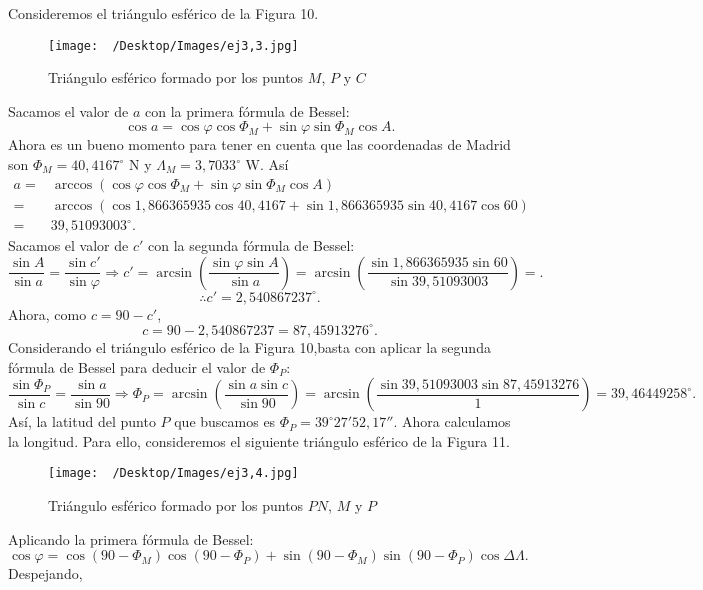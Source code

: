 \documentclass{article}
\begin{document}
\begin{sol}
Consideremos el triángulo esférico de la Figura 10. 
\begin{figure}
\centering
\texttt{[image: ~/Desktop/Images/ej3,3.jpg]}
\caption{Triángulo esférico formado por los puntos $\displaystyle M $, $\displaystyle P $ y $\displaystyle C $}
\label{}
\end{figure}Sacamos el valor de $\displaystyle a $ con la primera fórmula de Bessel:
\[ \cos a = \cos \varphi \cos \Phi_{M} + \sin\varphi \sin\Phi_{M}\cos A.\]
Ahora es un bueno momento para tener en cuenta que las coordenadas de Madrid son $\displaystyle \Phi_{M} = 40,4167^{\circ} $ N y $\displaystyle \Lambda_{M} = 3,7033^{\circ} $ W. Así
\[
\begin{split}
	a = & \arccos\left(\cos \varphi \cos \Phi_{M} + \sin\varphi \sin\Phi_{M}\cos A\right)\\
	= & \arccos\left(\cos1,866365935 \cos 40,4167 + \sin1,866365935 \sin40,4167\cos 60\right) \\
	= & 39,51093003^{\circ} .
\end{split}
\]
Sacamos el valor de $\displaystyle c' $ con la segunda fórmula de Bessel:
\[\frac{\sin A}{\sin a} = \frac{\sin c'}{\sin \varphi} \Rightarrow c' = \arcsin\left(\frac{\sin\varphi \sin A}{\sin a}\right) = \arcsin\left(\frac{\sin1,866365935 \sin 60}{\sin 39,51093003}\right) = .\]
\[\therefore c' = 2,540867237^{\circ} .\]
Ahora, como $\displaystyle c = 90 - c' $, 
\[c = 90 - 2,540867237 = 87,45913276^{\circ} .\]
Considerando el triángulo esférico de la Figura 10,basta con aplicar la segunda fórmula de Bessel para deducir el valor de $\displaystyle \Phi_{P} $:
\[ \frac{\sin\Phi_{P}}{\sin c} = \frac{\sin a}{\sin 90} \Rightarrow \Phi_{P} = \arcsin\left(\frac{\sin a \sin c}{\sin 90}\right) = \arcsin\left(\frac{\sin 39,51093003 \sin87,45913276 }{1}\right) = 39,46449258^{\circ}.\]
Así, la latitud del punto $\displaystyle P $ que buscamos es $\displaystyle \Phi_{P} = 39^{\circ }27'52,17''$. Ahora calculamos la longitud. Para ello, consideremos el siguiente triángulo esférico de la Figura 11.
\begin{figure}
\centering
\texttt{[image: ~/Desktop/Images/ej3,4.jpg]}
\caption{Triángulo esférico formado por los puntos $\displaystyle PN $, $\displaystyle M $ y $\displaystyle P $}
\label{}
\end{figure}
Aplicando la primera fórmula de Bessel:
\[ \cos \varphi = \cos\left(90-\Phi_{M}\right)\cos\left(90-\Phi_{P}\right) + \sin\left(90-\Phi_{M}\right)\sin\left(90-\Phi_{P}\right)\cos\Delta\Lambda  .\]
Despejando,

\end{sol}
\end{document}
